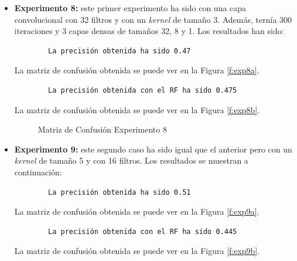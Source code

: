 \begin{itemize}
    \item \textbf{Experimento 8:} este primer experimento ha sido con una capa convolucional con 32 filtros y con un \emph{kernel} de tamaño 3. Además, ternía 300 iteraciones y 3 capas densas de tamaños 32, 8 y 1. Los resultados han sido:
    \begin{verbatim}
        La precisión obtenida ha sido 0.47
    \end{verbatim}
    La matriz de confusión obtenida se puede ver en la Figura \ref{f:exp8a}.
    \begin{verbatim}
        La precisión obtenida con el RF ha sido 0.475
    \end{verbatim}
    La matriz de confusión obtenida se puede ver en la Figura \ref{f:exp8b}.
    \begin{figure}[h]
     \centering
     \caption{Matriz de Confusión Experimento 8}
     \label{f:exp8}
    \end{figure}
    \item \textbf{Experimento 9:} este segundo caso ha sido igual que el anterior pero con un \emph{kernel} de tamaño 5 y con 16 filtros. Los resultados se muestran a continuación:
    \begin{verbatim}
        La precisión obtenida ha sido 0.51
    \end{verbatim}
    La matriz de confusión obtenida se puede ver en la Figura \ref{f:exp9a}.
    \begin{verbatim}    
        La precisión obtenida con el RF ha sido 0.445
    \end{verbatim}
    La matriz de confusión obtenida se puede ver en la Figura \ref{f:exp9b}.
    \begin{figure}[h]

\end{figure}
\end{itemize}
